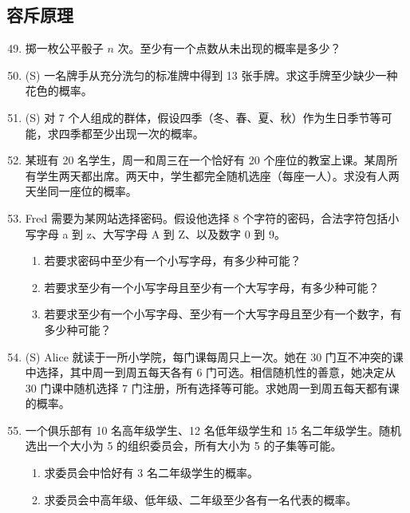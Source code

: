 \documentclass[UTF8, 12pt, fontset=fandol, oneside]{ctexart}
\begin{document}
\subsection*{容斥原理}

\begin{enumerate}
  \setcounter{enumi}{48}
  \item 掷一枚公平骰子 $n$ 次。至少有一个点数从未出现的概率是多少？

  \item (S) 一名牌手从充分洗匀的标准牌中得到 13 张手牌。求这手牌至少缺少一种花色的概率。

  \item (S) 对 7 个人组成的群体，假设四季（冬、春、夏、秋）作为生日季节等可能，求四季都至少出现一次的概率。

  \item 某班有 20 名学生，周一和周三在一个恰好有 20 个座位的教室上课。某周所有学生两天都出席。两天中，学生都完全随机选座（每座一人）。求没有人两天坐同一座位的概率。

  \item Fred 需要为某网站选择密码。假设他选择 8 个字符的密码，合法字符包括小写字母 a 到 z、大写字母 A 到 Z、以及数字 0 到 9。
  \begin{enumerate}
    \item 若要求密码中至少有一个小写字母，有多少种可能？
    \item 若要求至少有一个小写字母且至少有一个大写字母，有多少种可能？
    \item 若要求至少有一个小写字母、至少有一个大写字母且至少有一个数字，有多少种可能？
  \end{enumerate}

  \item (S) Alice 就读于一所小学院，每门课每周只上一次。她在 30 门互不冲突的课中选择，其中周一到周五每天各有 6 门可选。相信随机性的善意，她决定从 30 门课中随机选择 7 门注册，所有选择等可能。求她周一到周五每天都有课的概率。

  \item 一个俱乐部有 10 名高年级学生、12 名低年级学生和 15 名二年级学生。随机选出一个大小为 5 的组织委员会，所有大小为 5 的子集等可能。
  \begin{enumerate}
    \item 求委员会中恰好有 3 名二年级学生的概率。
    \item 求委员会中高年级、低年级、二年级至少各有一名代表的概率。
  \end{enumerate}
\end{enumerate}
\end{document}
